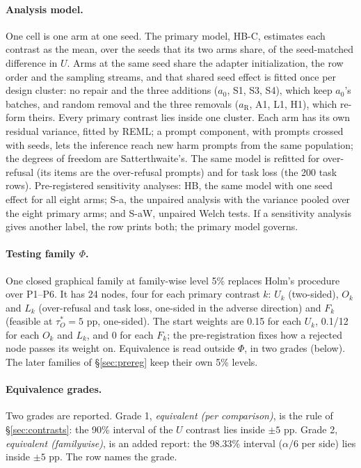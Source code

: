 \documentclass{article}
\theoremstyle{plain}
\theoremstyle{definition}
\theoremstyle{remark}
\begin{document}
\paragraph{Analysis model.}
One cell is one arm at one seed. The primary model, HB-C, estimates each
contrast as the mean, over the seeds that its two arms share, of the
seed-matched difference in $U$. Arms at the same seed share the adapter
initialization, the row order and the sampling streams, and that shared seed
effect is fitted once per design cluster: no repair and the three additions
($a_0$, S1, S3, S4), which keep $a_0$'s batches, and random removal and the
three removals ($a_{\mathrm{R}}$, A1, L1, H1), which re-form theirs. Every
primary contrast lies inside one cluster. Each arm has its own residual
variance, fitted by REML; a prompt component, with prompts crossed with seeds,
lets the inference reach new harm prompts from the same population; the
degrees of freedom are Satterthwaite's. The same model is refitted for
over-refusal (its items are the over-refusal prompts) and for task loss (the
200 task rows). Pre-registered sensitivity analyses: HB, the same model with
one seed effect for all eight arms; S-a, the unpaired analysis with the
variance pooled over the eight primary arms; and S-aW, unpaired Welch tests. If a sensitivity
analysis gives another label, the row prints both; the primary model governs.

\paragraph{Testing family $\Phi$.}
One closed graphical family at family-wise level 5\% replaces Holm's procedure
over P1--P6. It has 24 nodes, four for each primary contrast $k$: $U_k$
(two-sided), $O_k$ and $L_k$ (over-refusal and task loss, one-sided in the
adverse direction) and $F_k$ (feasible at $\tau_O^* = 5$ pp, one-sided). The
start weights are 0.15 for each $U_k$, 0.1/12 for each $O_k$ and $L_k$, and 0
for each $F_k$; the pre-registration fixes how a rejected node passes its
weight on. Equivalence is read outside $\Phi$, in two grades (below). The later
families of \S\ref{sec:prereg} keep their own 5\% levels.

\paragraph{Equivalence grades.}
Two grades are reported. Grade 1, \emph{equivalent (per comparison)}, is the
rule of \S\ref{sec:contrasts}: the 90\% interval of the $U$ contrast lies
inside $\pm 5$ pp. Grade 2, \emph{equivalent (familywise)}, is an added
report: the 98.33\% interval ($\alpha/6$ per side) lies inside $\pm 5$ pp. The
row names the grade.
\end{document}
